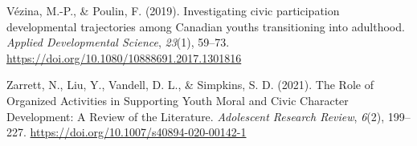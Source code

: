 \documentclass[
  man,
  floatsintext,
  longtable,
  nolmodern,
  notxfonts,
  notimes,
  colorlinks=true,linkcolor=blue,citecolor=blue,urlcolor=blue]{apa7}
\newlength{\cslhangindent}
\newenvironment{CSLReferences}[2] %
 {\begin{list}{}{%
  \setlength{\itemindent}{0pt}
  \setlength{\leftmargin}{0pt}
  \setlength{\parsep}{0pt}
  \ifodd #1
   \setlength{\leftmargin}{\cslhangindent}
   \setlength{\itemindent}{-1\cslhangindent}
  \fi
  \setlength{\itemsep}{#2\baselineskip}}}
 {\end{list}}
\begin{document}
\begin{CSLReferences}{1}{0}
Vézina, M.-P., \& Poulin, F. (2019). Investigating civic participation
developmental trajectories among {Canadian} youths transitioning into
adulthood. \emph{Applied Developmental Science}, \emph{23}(1), 59--73.
\url{https://doi.org/10.1080/10888691.2017.1301816}

Zarrett, N., Liu, Y., Vandell, D. L., \& Simpkins, S. D. (2021). The
{Role} of {Organized Activities} in {Supporting Youth Moral} and {Civic
Character Development}: {A Review} of the {Literature}. \emph{Adolescent
Research Review}, \emph{6}(2), 199--227.
\url{https://doi.org/10.1007/s40894-020-00142-1}

\end{CSLReferences}
\end{document}
